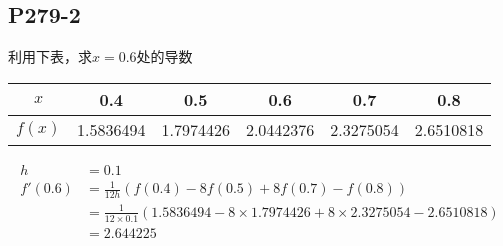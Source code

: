 \subsection{P279-2}
利用下表，求$x = 0.6$处的导数
\begin{center}
\begin{tabular}{c|c c c c c}
$x$ & 0.4 & 0.5 & 0.6 & 0.7 & 0.8 \\
\hline
$f(x)$ & 1.5836494 & 1.7974426 & 2.0442376 & 2.3275054 & 2.6510818
\end{tabular}
\end{center}

\begin{SOLVE}
\begin{align*}
h & = 0.1 \\
f'(0.6) & = \frac{1}{12h}(f(0.4) - 8 f(0.5) + 8 f(0.7) - f(0.8)) \\
        & = \frac{1}{12 \times 0.1}(1.5836494 - 8 \times 1.7974426 + 8 \times 2.3275054 - 2.6510818) \\
        & = 2.644225
\end{align*}
\end{SOLVE}